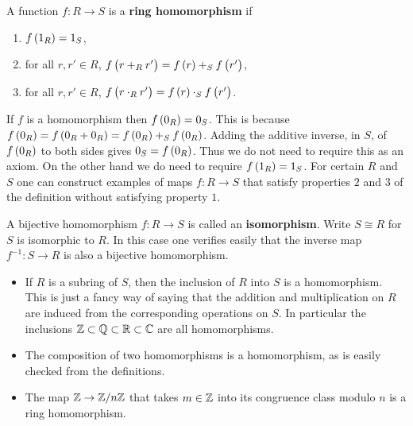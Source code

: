 \begin{definition}
A function $ f : R \to S $ is a \textbf{ring homomorphism} if
\begin{enumerate}
\item $ f\br{1_R} = 1_S $,
\item for all $ r, r' \in R $, $ f\br{r +_R r'} = f\br{r} +_S f\br{r'} $,
\item for all $ r, r' \in R $, $ f\br{r \cdot_R r'} = f\br{r} \cdot_S f\br{r'} $.
\end{enumerate}
\end{definition}

\begin{note*}
If $ f $ is a homomorphism then $ f\br{0_R} = 0_S $. This is because $ f\br{0_R} = f\br{0_R + 0_R} = f\br{0_R} +_S f\br{0_R} $. Adding the additive inverse, in $ S $, of $ f\br{0_R} $ to both sides gives $ 0_S = f\br{0_R} $. Thus we do not need to require this as an axiom. On the other hand we do need to require $ f\br{1_R} = 1_S $. For certain $ R $ and $ S $ one can construct examples of maps $ f : R \to S $ that satisfy properties $ 2 $ and $ 3 $ of the definition without satisfying property $ 1 $.
\end{note*}

\begin{definition}
A bijective homomorphism $ f : R \to S $ is called an \textbf{isomorphism}. Write $ S \cong R $ for $ S $ is isomorphic to $ R $. In this case one verifies easily that the inverse map $ f^{-1} : S \to R $ is also a bijective homomorphism.
\end{definition}

\begin{example*}
\hfill
\begin{itemize}
\item If $ R $ is a subring of $ S $, then the inclusion of $ R $ into $ S $ is a homomorphism. This is just a fancy way of saying that the addition and multiplication on $ R $ are induced from the corresponding operations on $ S $. In particular the inclusions $ \mathbb{Z} \subset \mathbb{Q} \subset \mathbb{R} \subset \mathbb{C} $ are all homomorphisms.
\item The composition of two homomorphisms is a homomorphism, as is easily checked from the definitions.
\item The map $ \mathbb{Z} \to \mathbb{Z} / n\mathbb{Z} $ that takes $ m \in \mathbb{Z} $ into its congruence class modulo $ n $ is a ring homomorphism.
\end{itemize}
\end{example*}

